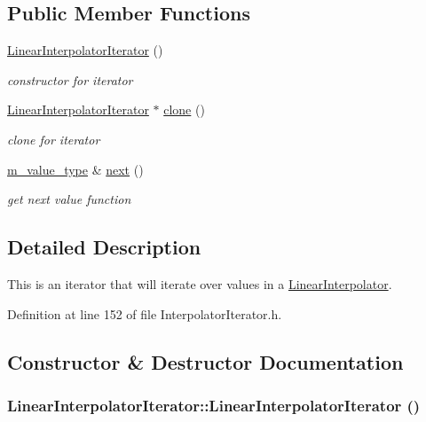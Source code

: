 \subsection*{Public Member Functions}
\begin{CompactItemize}
\item 
\hyperlink{classLinearInterpolatorIterator_a0}{Linear\-Interpolator\-Iterator} ()
\begin{CompactList}\small\item\em constructor for iterator \item\end{CompactList}\item 
\hyperlink{classLinearInterpolatorIterator}{Linear\-Interpolator\-Iterator} $\ast$ \hyperlink{classLinearInterpolatorIterator_a1}{clone} ()
\begin{CompactList}\small\item\em clone for iterator \item\end{CompactList}\item 
\hyperlink{Types_8h_a3}{m\_\-value\_\-type} \& \hyperlink{classLinearInterpolatorIterator_a2}{next} ()
\begin{CompactList}\small\item\em get next value function \item\end{CompactList}\end{CompactItemize}


\subsection{Detailed Description}
This is an iterator that will iterate over values in a \hyperlink{classLinearInterpolator}{Linear\-Interpolator}. 



Definition at line 152 of file Interpolator\-Iterator.h.

\subsection{Constructor \& Destructor Documentation}
\hypertarget{classLinearInterpolatorIterator_a0}{
\subsubsection[LinearInterpolatorIterator]{\setlength{\rightskip}{0pt plus 5cm}Linear\-Interpolator\-Iterator::Linear\-Interpolator\-Iterator ()}}
\label{classLinearInterpolatorIterator_a0}


